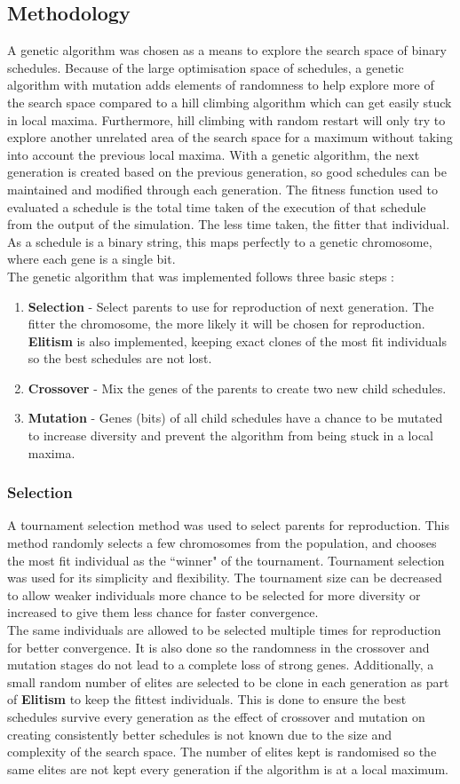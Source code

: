 \documentclass{article}
\newcommand{\n}[0]{\\[\baselineskip]}
\begin{document}
\subsection{Methodology}
A genetic algorithm was chosen as a means to explore the search space of binary schedules. Because of the large optimisation space of schedules, a genetic algorithm with mutation adds elements of randomness to help explore more of the search space compared to a hill climbing algorithm which can get easily stuck in local maxima. Furthermore, hill climbing with random restart will only try to explore another unrelated area of the search space for a maximum without taking into account the previous local maxima. With a genetic algorithm, the next generation is created based on the previous generation, so good schedules can be maintained and modified through each generation. The fitness function used to evaluated a schedule is the total time taken of the execution of that schedule from the output of the simulation. The less time taken, the fitter that individual. As a schedule is a binary string, this maps perfectly to a genetic chromosome, where each gene is a single bit.
\n
The genetic algorithm that was implemented follows three basic steps \cite{ga}:
\begin{enumerate}
\item \textbf{Selection} - Select parents to use for reproduction of next generation. The fitter the chromosome, the more likely it will be chosen for reproduction. \textbf{Elitism} is also implemented, keeping exact clones of the most fit individuals so the best schedules are not lost.
\item \textbf{Crossover} - Mix the genes of the parents to create two new child schedules.
\item \textbf{Mutation} - Genes (bits) of all child schedules have a chance to be mutated to increase diversity and prevent the algorithm from being stuck in a local maxima.
\end{enumerate}
\subsubsection{Selection}
A tournament selection method was used to select parents for reproduction. This method randomly selects a few chromosomes from the population, and chooses the most fit individual as the ``winner" of the tournament. Tournament selection was used for its simplicity and flexibility. The tournament size can be decreased to allow weaker individuals more chance to be selected for more diversity or increased to give them less chance for faster convergence. 
\n
The same individuals are allowed to be selected multiple times for reproduction for better convergence. It is also done so the randomness in the crossover and mutation stages do not lead to a complete loss of strong genes. Additionally, a small random number of elites are selected to be clone in each generation as part of \textbf{Elitism} to keep the fittest individuals. This is done to ensure the best schedules survive every generation as the effect of crossover and mutation on creating consistently better schedules is not known due to the size and complexity of the search space. The number of elites kept is randomised so the same elites are not kept every generation if the algorithm is at a local maximum.
\end{document}
